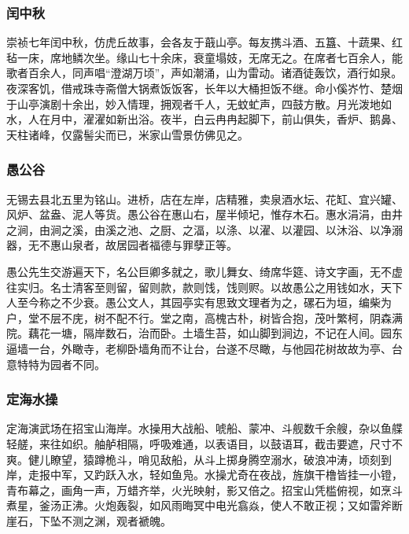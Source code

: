 \documentclass[]{article}
\begin{document}
\hypertarget{header-n570}{%
\subsubsection{闰中秋}\label{header-n570}}

崇祯七年闰中秋，仿虎丘故事，会各友于蕺山亭。每友携斗酒、五簋、十蔬果、红毡一床，席地鳞次坐。缘山七十余床，衰童塌妓，无席无之。在席者七百余人，能歌者百余人，同声唱``澄湖万顷''，声如潮涌，山为雷动。诸酒徒轰饮，酒行如泉。夜深客饥，借戒珠寺斋僧大锅煮饭饭客，长年以大桶担饭不继。命小傒岕竹、楚烟于山亭演剧十余出，妙入情理，拥观者千人，无蚊虻声，四鼓方散。月光泼地如水，人在月中，濯濯如新出浴。夜半，白云冉冉起脚下，前山俱失，香炉、鹅鼻、天柱诸峰，仅露髻尖而已，米家山雪景仿佛见之。

\hypertarget{header-n575}{%
\subsubsection{愚公谷}\label{header-n575}}

无锡去县北五里为铭山。进桥，店在左岸，店精雅，卖泉酒水坛、花缸、宜兴罐、风炉、盆盎、泥人等货。愚公谷在惠山右，屋半倾圮，惟存木石。惠水涓涓，由井之涧，由涧之溪，由溪之池、之厨、之湢，以涤、以濯、以灌园、以沐浴、以净溺器，无不惠山泉者，故居园者福德与罪孽正等。

愚公先生交游遍天下，名公巨卿多就之，歌儿舞女、绮席华筵、诗文字画，无不虚往实归。名士清客至则留，留则款，款则饯，饯则赆。以故愚公之用钱如水，天下人至今称之不少衰。愚公文人，其园亭实有思致文理者为之，磥石为垣，编柴为户，堂不层不庑，树不配不行。堂之南，高槐古朴，树皆合抱，茂叶繁柯，阴森满院。藕花一塘，隔岸数石，治而卧。土墙生苔，如山脚到涧边，不记在人间。园东逼墙一台，外瞰寺，老柳卧墙角而不让台，台遂不尽瞰，与他园花树故故为亭、台意特特为园者不同。

\hypertarget{header-n580}{%
\subsubsection{定海水操}\label{header-n580}}

定海演武场在招宝山海岸。水操用大战船、唬船、蒙冲、斗舰数千余艘，杂以鱼艓轻艖，来往如织。舳舻相隔，呼吸难通，以表语目，以鼓语耳，截击要遮，尺寸不爽。健儿瞭望，猿蹲桅斗，哨见敌船，从斗上掷身腾空溺水，破浪冲涛，顷刻到岸，走报中军，又趵跃入水，轻如鱼凫。水操尤奇在夜战，旌旗干橹皆挂一小镫，青布幕之，画角一声，万蜡齐举，火光映射，影又倍之。招宝山凭槛俯视，如烹斗煮星，釜汤正沸。火炮轰裂，如风雨晦冥中电光翕焱，使人不敢正视；又如雷斧断崖石，下坠不测之渊，观者褫魄。
\end{document}
